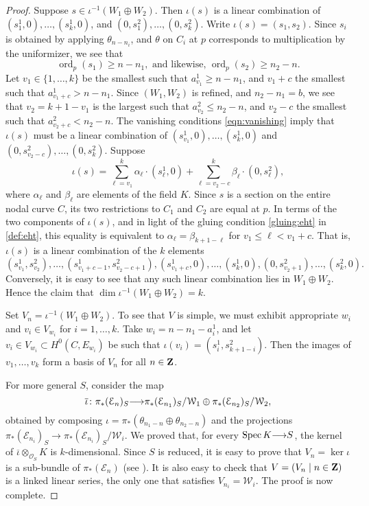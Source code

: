 \documentclass[11pt,reqno]{amsart}
\theoremstyle{plain}
\theoremstyle{definition}
\theoremstyle{remark}
\numberwithin{equation}{section}
\renewcommand{\to}{{\longrightarrow}}
\numberwithin{equation}{section}
\renewcommand{\O}{\mathcal O}
\DeclareMathOperator{\ord}{ord}
\begin{document}
\begin{proof}
  Suppose $s \in \iota^{-1}(W_1 \oplus W_2)$.
  Then $\iota(s)$ is a linear combination of $(s^1_1,0), \dots, (s^1_k, 0)$, and $(0, s^2_1), \dots, (0,s^2_k)$.
  Write $\iota(s) = (s_1, s_2)$.
  Since $s_i$ is obtained by applying $\theta_{n-n_i}$, and $\theta$ on $C_i$ at $p$ corresponds to multiplication by the uniformizer, we see that
  \begin{equation}\label{eqn:vanishing}
    \ord_p(s_1) \geq n - n_1, \text{ and likewise, } \ord_p(s_2) \geq n_2 - n.
  \end{equation}
  Let $v_1 \in \{1, \dots, k\}$ be the smallest such that $a^1_{v_1} \geq n-n_1$, and $v_1+c$ the smallest such that $a^1_{v_1+c} > n-n_1$.
  Since $(W_1, W_2)$ is refined, and $n_2 - n_1 = b$, we see that $v_2 = k+1-v_1$ is the largest such that $a^2_{v_2} \leq n_2 - n$, and $v_2 - c$ the smallest such that $a^2_{v_2 + c} < n_2 - n$.
  The vanishing conditions \eqref{eqn:vanishing} imply that $\iota(s)$ must be a linear combination of $(s^1_{v_1},0), \dots, (s^1_k,0)$ and $(0, s^2_{v_2-c}), \dots,  (0,s^2_k)$.
  Suppose
  \[ \iota(s) = \sum_{\ell = v_1}^k \alpha_{\ell} \cdot (s^1_\ell,0) + \sum_{\ell = v_2-c}^{k} \beta_\ell \cdot (0,s^2_\ell),\]
  where $\alpha_{\ell}$ and $\beta_{\ell}$ are elements of the field $K$.
  Since $s$ is a section on the entire nodal curve $C$, its two restrictions to $C_1$ and $C_2$ are equal at $p$.
  In terms of the two components of $\iota(s)$, and in light of the gluing condition \eqref{gluing:eht} in \autoref{def:eht}, this equality is equivalent to $\alpha_{\ell} = \beta_{k+1-\ell}$ for $v_1 \leq \ell < v_1+c$.
  That is, $\iota(s)$ is a linear combination of the $k$ elements 
  \[ (s^1_{v_1} , s^2_{v_2}), \dots, (s^1_{v_1+c-1} , s^2_{v_2-c+1}), (s^1_{v_1+c},0), \dots, (s^1_k,0), (0,s^2_{v_2+1}), \dots, (s^2_{k},0).\]  
  Conversely, it is easy to see that any such linear combination lies in $W_1 \oplus W_2$.
  Hence the claim that $\dim \iota^{-1}(W_1 \oplus W_2) = k$.

  Set $V_n = \iota^{-1}(W_1 \oplus W_2)$.
  To see that $V$ is simple, we must exhibit appropriate $w_i$ and $v_i \in V_{w_i}$ for $i = 1, \dots, k$.
  Take $w_i = n-n_1-a^1_i$, and let $v_i \in V_{w_i} \subset H^0(C, E_{w_i})$ be such that $\iota(v_i) = (s^1_i, s^2_{k+1-i})$.
  Then the images of $v_1, \dots, v_k$ form a basis of $V_n$ for all $n \in {\bf Z}$.

  For more general $S$, consider the map
  \[ \overline \iota \from \pi_* (\mathcal E_n)_S \to \pi_*(\mathcal E_{n_1})_S / \mathcal W_1 \oplus \pi_*(\mathcal E_{n_2})_S / \mathcal W_2,\]
  obtained by composing $\iota = \pi_*(\theta_{n_1-n} \oplus \theta_{n_2-n})$ and the projections $\pi_*(\mathcal E_{n_i})_S \to \pi_*(\mathcal E_{n_i})_S / \mathcal W_i$.
  We proved that, for every $\spec K \to S$, the kernel of $\overline \iota \otimes_{\O_S} K$ is $k$-dimensional.
  Since $S$ is reduced, it is easy to prove that $V_n = \ker \iota$ is a sub-bundle of $\pi_*(\mathcal E_n)$ (see \cite[B.3.4 with reduced $B$]{oss:14}).
  It is also easy to check that $V = (V_n \mid n \in {\bf Z})$ is a linked linear series, the only one that satisfies $V_{n_i} = \mathcal W_i$.
  The proof is now complete.
\end{proof}
\end{document}
